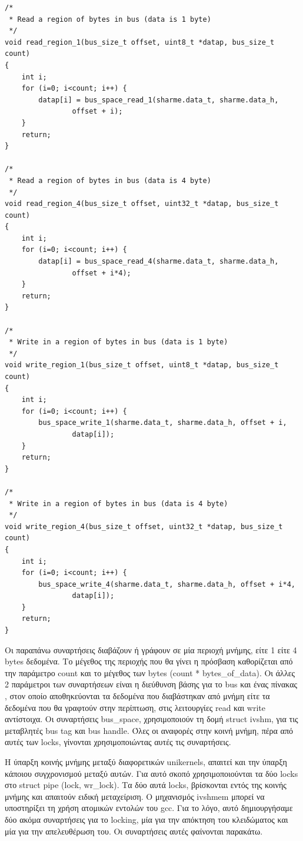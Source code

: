 \begin{lstlisting}
/*
 * Read a region of bytes in bus (data is 1 byte)
 */
void read_region_1(bus_size_t offset, uint8_t *datap, bus_size_t count)
{
	int i;
	for (i=0; i<count; i++) {
		datap[i] = bus_space_read_1(sharme.data_t, sharme.data_h,
				offset + i);
	}
	return;
}

/*
 * Read a region of bytes in bus (data is 4 byte)
 */
void read_region_4(bus_size_t offset, uint32_t *datap, bus_size_t count)
{
	int i;
	for (i=0; i<count; i++) {
		datap[i] = bus_space_read_4(sharme.data_t, sharme.data_h,
				offset + i*4);
	}
	return;
}

/*
 * Write in a region of bytes in bus (data is 1 byte)
 */
void write_region_1(bus_size_t offset, uint8_t *datap, bus_size_t count)
{
	int i;
	for (i=0; i<count; i++) {
		bus_space_write_1(sharme.data_t, sharme.data_h, offset + i,
				datap[i]);
	}
	return;
}

/*
 * Write in a region of bytes in bus (data is 4 byte)
 */
void write_region_4(bus_size_t offset, uint32_t *datap, bus_size_t count)
{
	int i;
	for (i=0; i<count; i++) {
		bus_space_write_4(sharme.data_t, sharme.data_h,	offset + i*4,
				datap[i]);
	}
	return;
}
\end{lstlisting}

Οι παραπάνω συναρτήσεις διαβάζουν ή γράφουν σε μία περιοχή μνήμης, είτε 1 είτε 4
bytes δεδομένα. Το μέγεθος της περιοχής που θα γίνει η πρόσβαση καθορίζεται από
την παράμετρο count και το μέγεθος των bytes (count * bytes\_of\_data). Οι άλλες
2 παράμετροι των συναρτήσεων είναι η διεύθυνση βάσης για το bus και ένας πίνακας
, στον οποίο αποθηκεύονται τα δεδομένα που διαβάστηκαν από μνήμη είτε τα
δεδομένα που θα γραφτούν στην περίπτωση, στις λειτουργίες read και write
αντίστοιχα. Οι συναρτήσεις bus\_space, χρησιμοποιούν τη δομή struct ivshm, για
τις μεταβλητές bus tag και bus handle. Όλες οι αναφορές στην κοινή μνήμη, πέρα
από αυτές των locks, γίνονται χρησιμοποιώντας αυτές τις συναρτήσεις.

Η ύπαρξη κοινής μνήμης μεταξύ διαφορετικών unikernels, απαιτεί και την ύπαρξη
κάποιου συγχρονισμού μεταξύ αυτών. Για αυτό σκοπό χρησιμοποιούνται τα δύο locks
στο struct pipe (lock, wr\_lock). Τα δύο αυτά locks, βρίσκονται εντός της κοινής
μνήμης και απαιτούν ειδική μεταχείριση. Ο μηχανισμός ivshmem μπορεί να
υποστηρίξει τη χρήση ατομικών εντολών του gcc. Για το λόγο, αυτό δημιουργήσαμε
δύο ακόμα συναρτήσεις για το locking, μία για την απόκτηση του κλειδώματος και
μία για την απελευθέρωση του. Οι συναρτήσεις αυτές φαίνονται παρακάτω. 

